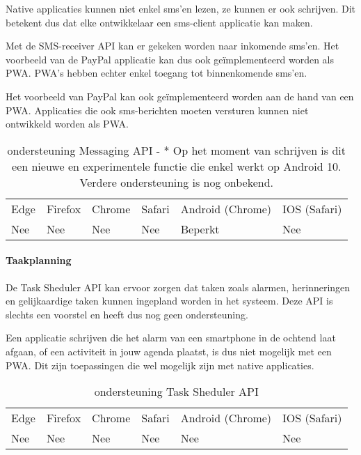 Native applicaties kunnen niet enkel sms’en lezen, ze kunnen er ook schrijven. Dit betekent dus dat elke ontwikkelaar een sms-client applicatie kan maken.

Met de SMS-receiver API \autocite{Fullea2020} kan er gekeken worden naar inkomende sms’en. Het voorbeeld van de PayPal applicatie kan dus ook geïmplementeerd worden als PWA. PWA’s hebben echter enkel toegang tot binnenkomende sms’en. 

Het voorbeeld van PayPal kan ook geïmplementeerd worden aan de hand van een PWA. Applicaties die ook sms-berichten moeten versturen kunnen niet ontwikkeld worden als PWA.

\begin{table}[]
	\begin{tabular}{llllll}
		Edge & Firefox & Chrome & Safari & Android (Chrome) & IOS (Safari) \\
		Nee   & Nee      &  Nee     & Nee     & Beperkt               & Nee          
	\end{tabular}	
	\caption{ondersteuning Messaging API - * Op het moment van schrijven is dit een nieuwe en experimentele functie die enkel werkt op 
	Android 10. Verdere ondersteuning is nog onbekend.
	}
	\label{ondersteuning Messaging API}
\end{table}	



\paragraph{Taakplanning}
De Task Sheduler API \autocite{Kulkarni2020} kan ervoor zorgen dat taken zoals alarmen, herinneringen en gelijkaardige taken kunnen ingepland worden in het systeem. Deze API is slechts een voorstel en heeft dus nog geen ondersteuning.

Een applicatie schrijven die het alarm van een smartphone in de ochtend laat afgaan, of een activiteit in jouw agenda plaatst, is dus niet mogelijk met een PWA. Dit zijn toepassingen die wel mogelijk zijn met native applicaties.

\begin{table}[]
	\begin{tabular}{llllll}
		Edge & Firefox & Chrome & Safari & Android (Chrome) & IOS (Safari) \\
		Nee   & Nee      &  Nee     & Nee     & Nee               & Nee          
	\end{tabular}	
	\caption{ondersteuning Task Sheduler API }
	\label{ondersteuning Task Sheduler API}
\end{table}	



